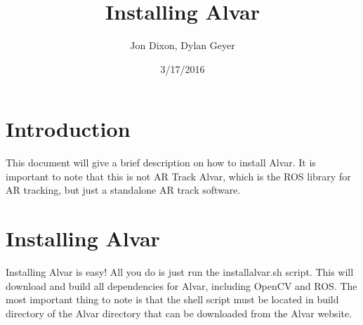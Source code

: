 \documentclass{article}
\title{Installing Alvar}
\date{3/17/2016}
\author{Jon Dixon, Dylan Geyer}
\begin{document}
	\maketitle
	\newpage
	
	\section{Introduction}
	This document will give a brief description on how to install Alvar. It is important to note that this is not AR Track Alvar, which is the ROS library for AR tracking, but just a standalone AR track software.
	
	\section{Installing Alvar}
	Installing Alvar is easy! All you do is just run the installalvar.sh script. This will download and build all dependencies for Alvar, including OpenCV and ROS. The most important thing to note is that the shell script must be located in build directory of the Alvar directory that can be downloaded from the Alvar website.

	
\end{document}
